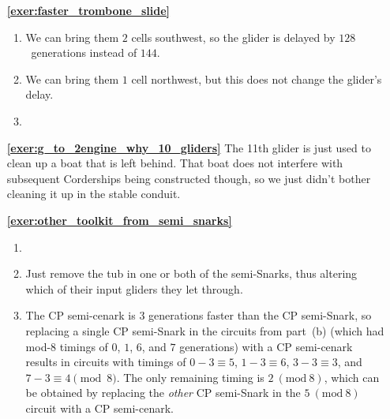 \begin{multicols}{2}
\begin{itemize}[leftmargin=0em]
\begin{enumerate}[leftmargin=1.5em,label=\bf\color{ocre}(\alph*)]
			\item {} \\
			
			\item {} \\
		\end{enumerate}
	

		\item[\bf\color{ocre}\sffamily\ref{exer:faster_trombone_slide}] \begin{enumerate}[leftmargin=1.5em,label=\bf\color{ocre}(\alph*)]
			\item We can bring them $2$ cells southwest, so the glider is delayed by $128$~generations instead of $144$.
			
			\item We can bring them $1$ cell northwest, but this does not change the glider's delay.
			
			\item {} \\
		\end{enumerate}
		
		
		
		\item[\bf\color{ocre}\sffamily\ref{exer:g_to_2engine_why_10_gliders}] The 11th glider is just used to clean up a boat that is left behind. That boat does not interfere with subsequent Corderships being constructed though, so we just didn't bother cleaning it up in the stable conduit.\\
		
		
		\item[\bf\color{ocre}\sffamily\ref{exer:other_toolkit_from_semi_snarks}] \begin{enumerate}[leftmargin=1.5em,label=\bf\color{ocre}(\alph*)]
			\item {} \\
			
			\item Just remove the tub in one or both of the semi-Snarks, thus altering which of their input gliders they let through.
			
			\item The CP semi-cenark is $3$ generations faster than the CP semi-Snark, so replacing a single CP semi-Snark in the circuits from part~(b) (which had mod-$8$ timings of $0$, $1$, $6$, and $7$ generations) with a CP semi-cenark results in circuits with timings of $0-3 \equiv 5$, $1 - 3 \equiv 6$, $3 - 3 \equiv 3$, and $7 - 3 \equiv 4 \pmod{8}$. The only remaining timing is $2 \ (\text{mod} \ 8)$, which can be obtained by replacing the \emph{other} CP semi-Snark in the $5 \ (\text{mod} \ 8)$ circuit with a CP semi-cenark.\\
		\end{enumerate}
		

\end{itemize}
\end{multicols}
